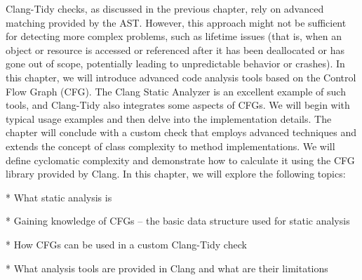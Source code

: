 \begin{markdown}
Clang-Tidy checks, as discussed in the previous chapter, rely on advanced matching provided by the AST. However, this approach might not be sufficient for detecting more complex problems, such as lifetime issues (that is, when an object or resource is accessed or referenced after it has been deallocated or has gone out of scope, potentially leading to unpredictable behavior or crashes). In this chapter, we will introduce advanced code analysis tools based on the Control Flow Graph (CFG). The Clang Static Analyzer is an excellent example of such tools, and Clang-Tidy also integrates some aspects of CFGs. We will begin with typical usage examples and then delve into the implementation details. The chapter will conclude with a custom check that employs advanced techniques and extends the concept of class complexity to method implementations. We will define cyclomatic complexity and demonstrate how to calculate it using the CFG library provided by Clang. In this chapter, we will explore the following topics:

* What static analysis is

* Gaining knowledge of CFGs – the basic data structure used for static analysis

* How CFGs can be used in a custom Clang-Tidy check

* What analysis tools are provided in Clang and what are their limitations

\end{markdown}